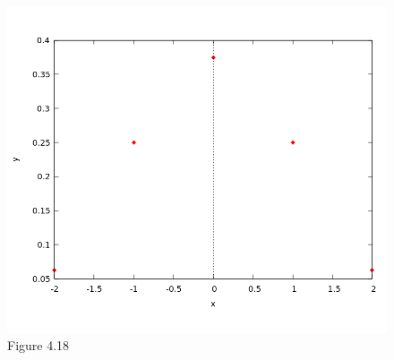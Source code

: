 \documentclass{article}
\begin{document}
\begin{itemize}
\begin{figure}[H]
    \centering
    \includegraphics[scale=0.6]{plot}
    \caption{Figure 4.18}
  \end{figure}
  

\end{itemize}
\end{document}

